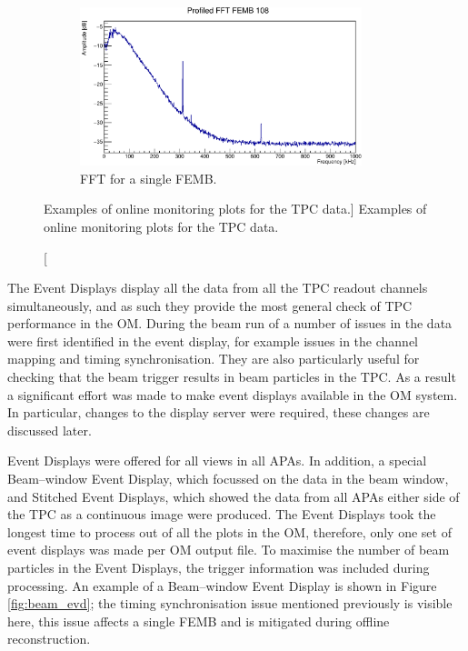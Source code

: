 \begin{figure}
	\begin{subfigure}[b]{0.85\textwidth}
		\centering
		\vspace{3mm}
		\includegraphics[width=0.9\textwidth]{figures/tpc_fft.pdf}
		\caption {FFT for a single FEMB.}
		\label{fig:TPC_FFT}
	\end{subfigure}

	\caption
	[Examples of online monitoring plots for the TPC data.]
	{Examples of online monitoring plots for the TPC data.}
	\label{fig:tpc_om}

\end{figure}

The Event Displays display all the data from all the TPC readout channels
simultaneously, and as such they provide the most general check of TPC 
performance in the OM. During the beam run of \protodune{} a number of issues in
the data were first identified in the event display, for example issues in the 
channel mapping and timing synchronisation. They are also particularly useful 
for checking that the beam trigger results in beam particles in the TPC. As 
a result a significant effort was made to make event displays available in 
the \protodune{} OM system. In particular, changes to the display server 
were required, these changes are discussed later. 

Event Displays were offered for all views in all APAs. In addition, a special 
Beam--window Event Display, which focussed on the data in the beam window, and 
Stitched Event Displays, which showed the data from all APAs either side of the
TPC as a continuous image were produced. The Event Displays took the longest 
time to process out of all the plots in the OM, therefore, only one set of 
event displays was made per OM output file. To maximise the number of beam 
particles in the Event Displays, the trigger information was included during 
processing. An example of a Beam--window Event Display is shown in Figure 
\ref{fig:beam_evd}; the timing synchronisation issue mentioned previously is 
visible here, this issue affects a single FEMB and is mitigated during offline 
reconstruction.  

